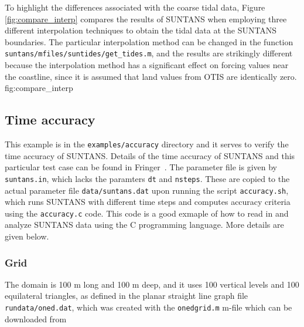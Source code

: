 To highlight the differences associated with the coarse tidal data, Figure \ref{fig:compare_interp} compares
the results of SUNTANS when employing three different interpolation techniques to obtain the tidal data
at the SUNTANS boundaries.  The particular interpolation method can be changed in the function \verb+suntans/mfiles/suntides/get_tides.m+,
and the results are strikingly different because the interpolation method has a significant effect on
forcing values near the coastline, since it is assumed that land values from OTIS are identically zero.
{fig:compare_interp}


\subsection{Time accuracy} \label{sec:timeaccuracy}

This example is in the \verb+examples/accuracy+ directory and it
serves to verify the time accuracy of SUNTANS.  Details of the time accuracy
of SUNTANS and this particular test case can be found in Fringer\etal~\cite{FRINGER[2005]}.
The parameter file is given by
\verb+suntans.in+, which lacks the paramters \verb+dt+ and \verb+nsteps+.  These
are copied to the actual parameter file \verb+data/suntans.dat+ upon running the
script \verb+accuracy.sh+, which runs SUNTANS with different time steps and computes
accuracy criteria using the \verb+accuracy.c+ code.  This code is a good exmaple
of how to read in and analyze SUNTANS data using the C programming language.  More
details are given below.

\subsubsection{Grid}

The domain is 100 m long and 100 m deep, and it
uses 100 vertical levels and 100 equilateral triangles, as defined in the planar
straight line graph file \verb+rundata/oned.dat+, which was created with the
\verb+onedgrid.m+ m-file which can be downloaded from 

